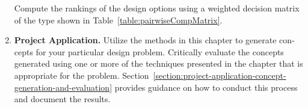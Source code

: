 \begin{enumerate}
Compute the rankings of the design options using a weighted decision
matrix of the type shown in Table~\ref{table:pairwiseCompMatrix}.


\item
  \textbf{Project Application.} Utilize the methods in this chapter to
  generate con­cepts for your particular design problem. Critically
  evaluate the concepts generated using one or more of the techniques
  presented in the chapter that is appropriate for the problem. 
  Section~\ref{section:project-application-concept-generation-and-evaluation}
  pro­vides guidance on how to conduct this process and document the
  results.
\end{enumerate}

